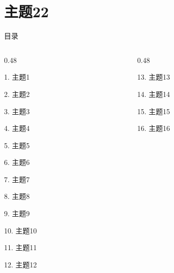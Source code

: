 \documentclass[aspectratio=169,10pt,fontset=fandol]{ctexbeamer}
\begin{document}
\section{主题22}
\begin{frame}[t,fragile]{目录}
\small
\begin{columns}[T,onlytextwidth]
\begin{column}{0.48\textwidth}
{\color{black}\small 1. 主题1\par}\vspace{0.22em}
{\color{black}\small 2. 主题2\par}\vspace{0.22em}
{\color{black}\small 3. 主题3\par}\vspace{0.22em}
{\color{black}\small 4. 主题4\par}\vspace{0.22em}
{\color{black}\small 5. 主题5\par}\vspace{0.22em}
{\color{black}\small 6. 主题6\par}\vspace{0.22em}
{\color{black}\small 7. 主题7\par}\vspace{0.22em}
{\color{black}\small 8. 主题8\par}\vspace{0.22em}
{\color{black}\small 9. 主题9\par}\vspace{0.22em}
{\color{black}\small 10. 主题10\par}\vspace{0.22em}
{\color{black}\small 11. 主题11\par}\vspace{0.22em}
{\color{black}\small 12. 主题12\par}\vspace{0.22em}
\end{column}
\begin{column}{0.48\textwidth}
{\color{black}\small 13. 主题13\par}\vspace{0.22em}
{\color{black}\small 14. 主题14\par}\vspace{0.22em}
{\color{black}\small 15. 主题15\par}\vspace{0.22em}
{\color{black}\small 16. 主题16\par}\vspace{0.22em}

\end{column}
\end{columns}
\end{frame}
\end{document}
